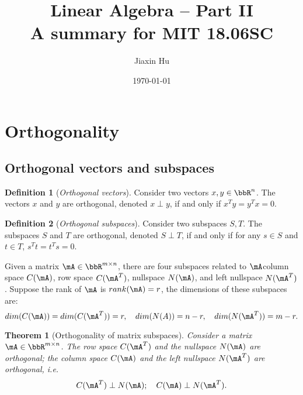 \documentclass[11pt]{article}
\title{\textbf{Linear Algebra -- Part II}\\A summary for MIT 18.06SC}
\date{\today}
\author{%
Jiaxin Hu
}
\theoremstyle{plain}
\newtheorem{thm}{Theorem}[section]
\theoremstyle{definition}
\newtheorem{defn}{Definition}
\begin{document}

\maketitle


\section{Orthogonality}

\subsection{Orthogonal vectors and subspaces}
\begin{defn}[\textit{Orthogonal vectors}]\label{def:vortho}
	Consider two vectors $x,y \in \bbR^{n}$. The vectors $x$ and $y$ are orthogonal,  denoted $x \perp y$, if and only if $x^T y = y^T x = 0$.
\end{defn}

\begin{defn}[\textit{Orthogonal subspaces}]\label{def:sortho}
	Consider two subspaces $S,T$. The subspaces $S$ and $T$ are orthogonal,  denoted $S \perp T$, if and only if for any $s \in S$ and $ t \in T$, $s^T t = t^T s = 0$.
\end{defn}

Given a matrix $\mA \in \bbR^{m \times n}$, there are four subspaces related to $\mA$\colon column space $C(\mA)$, row space $C(\mA^T)$, nullspace $N(\mA)$, and left nullspace $N(\mA^T)$. Suppose the rank of $\mA$ is $rank(\mA) = r$, the dimensions of these subspaces are: 
\[ dim(C(\mA)) = dim(C(\mA^T)) = r,\quad  dim(N(A)) = n-r,\quad dim(N(\mA^T)) = m-r. \] 

\begin{thm}[Orthogonality of matrix subspaces]\label{thm:ortho}
	Consider a matrix $\mA \in \bbR^{m \times n}$. The row space $C(\mA^T)$ and the nullspace $N(\mA)$ are orthogonal; the column space $C(\mA)$ and the left nullspace $N(\mA^T)$ are orthogonal, i.e.\
	\[ C(\mA^T) \perp N(\mA); \quad C(\mA) \perp N(\mA^T).  \]
\end{thm}
\end{document}
